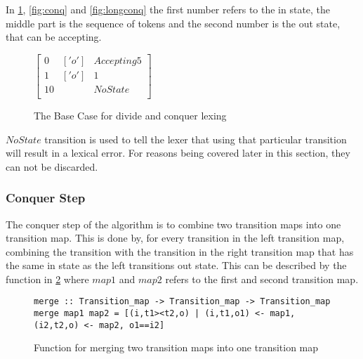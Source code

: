 In \cref{fig:bascas}, \cref{fig:conq} and \cref{fig:longconq} the first number
refers to the in state, the middle part is the sequence of tokens and the second
number is the out state, that can be accepting.

\begin{figure}[!ht]
\begin{center}
$\left[\begin{array}{ccc}
0&['o']&Accepting 5\\
1&['o']&1\\
10& &NoState\\
\end{array}\right]$
\caption{The Base Case for divide and conquer lexing \label{fig:bascas}}
\end{center}
\end{figure}

$NoState$ transition is used to tell the lexer that using that particular 
transition will result in a lexical error. For reasons being covered later in
this section, they can not be discarded.

\subsubsection{Conquer Step}
The conquer step of the algorithm is to combine two transition maps into one
transition map. This is done by, for every transition in the left transition
map, combining the transition with the transition in the right transition map
that has the same in state as the left transitions out state. This can be
described by the function in \cref{fig:mergetransmap} where $map1$ and $map2$
refers to the first and second transition map.

\begin{figure}
\begin{lstlisting}
merge :: Transition_map -> Transition_map -> Transition_map
merge map1 map2 = [(i,t1><t2,o) | (i,t1,o1) <- map1, (i2,t2,o) <- map2, o1==i2]
\end{lstlisting}
\caption{Function for merging two transition maps into one transition map
  \label{fig:mergetransmap}}
\end{figure}

